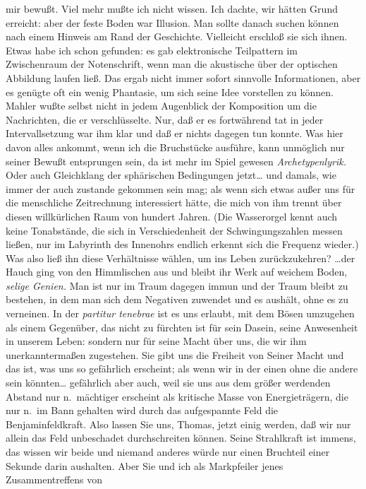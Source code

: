 \documentclass[
]{article}
\begin{document}
mir bewußt. Viel mehr mußte ich nicht wissen. Ich dachte, wir hätten
Grund erreicht: aber der feste Boden war Illusion. Man sollte danach
suchen können nach einem Hinweis am Rand der Geschichte. Vielleicht
erschloß sie sich ihnen. Etwas habe ich schon gefunden: es gab
elektronische Teilpattern im Zwischenraum der Notenschrift, wenn man die
akustische über der optischen Abbildung laufen ließ. Das ergab nicht
immer sofort sinnvolle Informationen, aber es genügte oft ein wenig
Phantasie, um sich seine Idee vorstellen zu können. Mahler wußte selbst
nicht in jedem Augenblick der Komposition um die Nachrichten, die er
verschlüsselte. Nur, daß er es fortwährend tat in jeder Intervallsetzung
war ihm klar und daß er nichts dagegen tun konnte. Was hier davon alles
ankommt, wenn ich die Bruchstücke ausführe, kann unmöglich nur seiner
Bewußt entsprungen sein, da ist mehr im Spiel gewesen
\emph{Archetypenlyrik.} Oder auch Gleichklang der sphärischen
Bedingungen jetzt\ldots{} und damals, wie immer der auch zustande
gekommen sein mag; als wenn sich etwas außer uns für die menschliche
Zeitrechnung interessiert hätte, die mich von ihm trennt über diesen
willkürlichen Raum von hundert Jahren. (Die Wasserorgel kennt auch keine
Tonabstände, die sich in Verschiedenheit der Schwingungszahlen messen
ließen, nur im Labyrinth des Innenohrs endlich erkennt sich die Frequenz
wieder.) Was also ließ ihn diese Verhältnisse wählen, um ins Leben
zurückzukehren? \ldots der Hauch ging von den Himmlischen aus und bleibt
ihr Werk auf weichem Boden, \emph{selige Genien.} Man ist nur im Traum
dagegen immun und der Traum bleibt zu bestehen, in dem man sich dem
Negativen zuwendet und es aushält, ohne es zu verneinen. In der
\emph{partitur tenebrae }ist es uns erlaubt, mit dem Bösen umzugehen als
einem Gegenüber, das nicht zu fürchten ist für sein Dasein, seine
Anwesenheit in unserem Leben: sondern nur für seine Macht über uns, die
wir ihm unerkanntermaßen zugestehen. Sie gibt uns die Freiheit von
Seiner Macht und das ist, was uns so gefährlich erscheint; als wenn wir
in der einen ohne die andere sein könnten\ldots{} gefährlich aber auch,
weil sie uns aus dem größer werdenden Abstand nur n.~mächtiger erscheint
als kritische Masse von Energieträgern, die nur n.~im Bann gehalten wird
durch das aufgespannte Feld die Benjaminfeldkraft. Also lassen Sie uns,
Thomas, jetzt einig werden, daß wir nur allein das Feld unbeschadet
durchschreiten können. Seine Strahlkraft ist immens, das wissen wir
beide und niemand anderes würde nur einen Bruchteil einer Sekunde darin
aushalten. Aber Sie und ich als Markpfeiler jenes Zusammentreffens von
\end{document}
